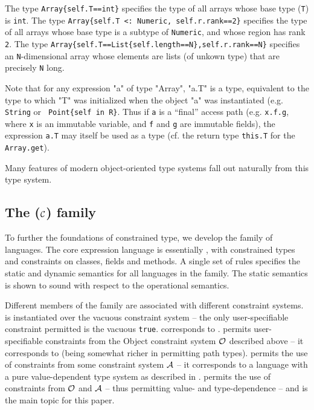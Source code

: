 The type {\tt Array\{self.T==int\}} specifies the type of all arrays
whose base type ({\tt T}) is {\tt int}. The type {\tt Array\{self.T <:
Numeric, self.r.rank==2\}} specifies the type of all arrays whose base
type is a subtype of {\tt Numeric}, and whose region has rank {\tt 2}.
The type {\tt Array\{self.T==List\{self.length==N\},self.r.rank==N\}}
specifies an {\tt N}-dimensional array whose elements are lists (of
unkown type) that are precisely {\tt N} long.

Note that for any expression \xcd"a" of type \xcd"Array", \xcd"a.T" is
a type, equivalent to the type to which \xcd"T" was initialized when
the object \xcd"a" was instantiated (e.g.{} {\tt String} or {\tt
Point\{self in R\}}.  Thus if {\tt a} is a ``final'' access path
(e.g. {\tt x.f.g}, where {\tt x} is an immutable variable, and {\tt f}
and {\tt g} are immutable fields), the expression {\tt a.T} may itself
be used as a type (cf. the return type {\tt this.T} for the {\tt
Array.get}).

Many features of modern object-oriented type systems fall out
naturally from this type system.

\subsection{The \FX($\cal C$) family}
To further the foundations of constrained type, we develop the \FX{}
family of languages. The core expression language is essentially
\FJ \cite{FJ}, with constrained types and constraints on classes, fields
and methods. A single set of rules specifies the static and dynamic
semantics for all languages in the family.  The static semantics is
shown to sound with respect to the operational semantics.

Different members of the family are associated with different
constraint systems. \FXZ{} is
\FX{} instantiated over the vacuous constraint system -- the only
user-specifiable constraint permitted is the vacuous {\tt true}. \FXZ{}
corresponds to \FJ. \FXG{} permits user-specifiable constraints from the 
Object constraint system $\cal O$ described above -- it corresponds to
\FGJ{} (being somewhat richer in permitting path types). \FXD{} permits
the use of constraints from some constraint system $\cal A$ -- it
corresponds to a language with a pure value-dependent type system as
described in \cite{OOPSLA08}. \FXGD{} permits the use of constraints
from $\cal O$ and $\cal A$ -- thus permitting value- and
type-dependence -- and is the main topic for this paper.

